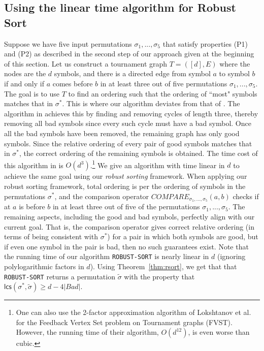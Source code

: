 \documentclass[11pt]{llncs}
\newcommand{\robust}{{\textsf{Robust Sort}}\xspace}
\newcommand{\lcs}{{\textsf{lcs}}}
\begin{document}
\subsection{Using the linear time algorithm for \robust}
Suppose we have five input permutations $\sigma_1, ..., \sigma_5$ that satisfy properties (P1) and (P2) as described in the second step of our approach given at the beginning of this section. 
Let us construct a tournament graph $T = ([d], E)$ where the nodes are the $d$ symbols, and there is a directed edge from symbol $a$ to symbol $b$ if and only if $a$ comes before $b$ in at least three out of five permutations $\sigma_{1}, ..., \sigma_{5}$. The goal is to use $T$ to find an ordering such that the ordering of ``most" symbols matches that in $\sigma^*$. This is where our algorithm deviates from that of \cite{cdk23}. 
The algorithm in \cite{cdk23} achieves this by finding and removing cycles of length three, thereby removing all bad symbols since every such cycle must have a bad symbol. Once all the bad symbols have been removed, the remaining graph has only good symbols. Since the relative ordering of every pair of good symbols matches that in $\sigma^*$, the correct ordering of the remaining symbols is obtained. The time cost of this algorithm in \cite{cdk23} is $O(d^3)$.\footnote{One can also use the 2-factor approximation algorithm of Lokshtanov et al.~\cite{fvst} for the Feedback Vertex Set problem on Tournament graphs (FVST). However, the running time of their algorithm, $O(d^{12})$, is even worse than cubic.}
We give an algorithm with time linear in $d$ to achieve the same goal using our {\em robust sorting} framework. 
When applying our robust sorting framework, total ordering is per the ordering of symbols in the permutations $\sigma^*$, and the comparison operator {\tt $COMPARE_{\sigma_{1}, ..., \sigma_{5}}(a, b)$} checks if at $a$ is before $b$ in at least three out of five of the permutations $\sigma_{1}, ..., \sigma_{5}$.
The remaining aspects, including the good and bad symbols, perfectly align with our current goal. 
That is, the comparison operator gives correct relative ordering (in terms of being consistent with $\sigma^*$) for a pair in which both symbols are good, but if even one symbol in the pair is bad, then no such guarantees exist.
Note that the running time of our algorithm {\tt ROBUST-SORT} is nearly linear in $d$ (ignoring polylogarithmic factors in $d$). 
Using Theorem~\ref{thm:rsort}, we get that that {\tt ROBUST-SORT} returns a permutation $\tilde{\sigma}$ with the property that $\lcs(\sigma^*, \tilde{\sigma}) \geq d - 4 |Bad|$. 
\end{document}
